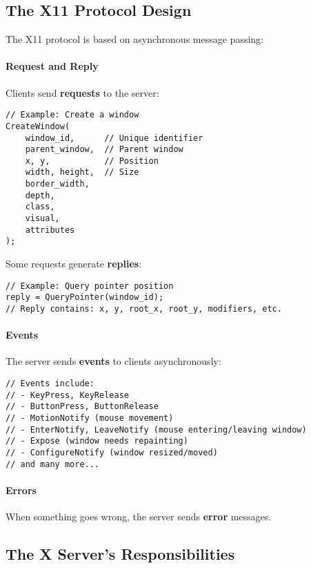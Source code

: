 \subsection{The X11 Protocol Design}

The X11 protocol is based on asynchronous message passing:

\paragraph{Request and Reply}

Clients send \textbf{requests} to the server:
\begin{lstlisting}[style=cstyle]
// Example: Create a window
CreateWindow(
    window_id,      // Unique identifier
    parent_window,  // Parent window
    x, y,           // Position
    width, height,  // Size
    border_width,
    depth,
    class,
    visual,
    attributes
);
\end{lstlisting}

Some requests generate \textbf{replies}:
\begin{lstlisting}[style=cstyle]
// Example: Query pointer position
reply = QueryPointer(window_id);
// Reply contains: x, y, root_x, root_y, modifiers, etc.
\end{lstlisting}

\paragraph{Events}

The server sends \textbf{events} to clients asynchronously:
\begin{lstlisting}[style=cstyle]
// Events include:
// - KeyPress, KeyRelease
// - ButtonPress, ButtonRelease
// - MotionNotify (mouse movement)
// - EnterNotify, LeaveNotify (mouse entering/leaving window)
// - Expose (window needs repainting)
// - ConfigureNotify (window resized/moved)
// and many more...
\end{lstlisting}

\paragraph{Errors}

When something goes wrong, the server sends \textbf{error} messages.

\subsection{The X Server's Responsibilities}

